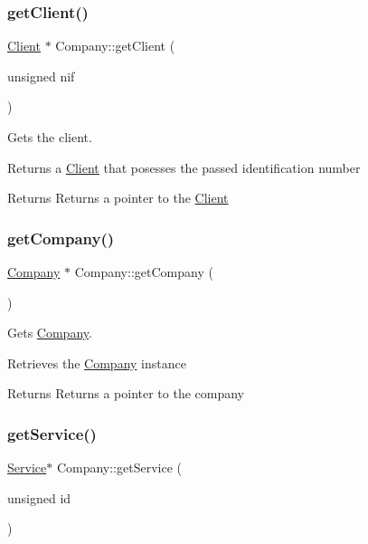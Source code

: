 \subsubsection{\texorpdfstring{get\+Client()}{getClient()}}
{\footnotesize\ttfamily \hyperlink{class_client}{Client} $\ast$ Company\+::get\+Client (\begin{DoxyParamCaption}\item[{unsigned}]{nif }\end{DoxyParamCaption})}



Gets the client. 

Returns a \hyperlink{class_client}{Client} that posesses the passed identification number

\begin{DoxyReturn}{Returns}
Returns a pointer to the \hyperlink{class_client}{Client} 
\end{DoxyReturn}
\mbox{\label{class_company_a453411f6ef4bab2e878867302fdcf484}} 
\subsubsection{\texorpdfstring{get\+Company()}{getCompany()}}
{\footnotesize\ttfamily \hyperlink{class_company}{Company} $\ast$ Company\+::get\+Company (\begin{DoxyParamCaption}{ }\end{DoxyParamCaption})\hspace{0.3cm}{\ttfamily [static]}}



Gets \hyperlink{class_company}{Company}. 

Retrieves the \hyperlink{class_company}{Company} instance

\begin{DoxyReturn}{Returns}
Returns a pointer to the company 
\end{DoxyReturn}
\mbox{\label{class_company_acf80072e8abec3e359387243d8cdc49f}} 
\subsubsection{\texorpdfstring{get\+Service()}{getService()}}
{\footnotesize\ttfamily \hyperlink{class_service}{Service}$\ast$ Company\+::get\+Service (\begin{DoxyParamCaption}\item[{unsigned}]{id }\end{DoxyParamCaption})}



